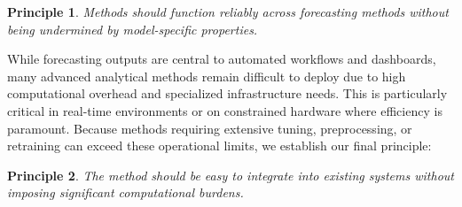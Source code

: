 \documentclass[preprint,12pt]{elsarticle}
\newtheorem{principle}{Principle}
\begin{document}
\begin{principle}
\textit{Methods should function reliably across forecasting methods without being undermined by model-specific properties.}
\end{principle}

While forecasting outputs are central to automated workflows and dashboards, many advanced analytical methods remain difficult to deploy due to high computational overhead and specialized infrastructure needs. This is particularly critical in real-time environments or on constrained hardware where efficiency is paramount. Because methods requiring extensive tuning, preprocessing, or retraining can exceed these operational limits, we establish our final principle:

\begin{principle}
\textit{The method should be easy to integrate into existing systems without imposing significant computational burdens.}
\end{principle}
\end{document}
